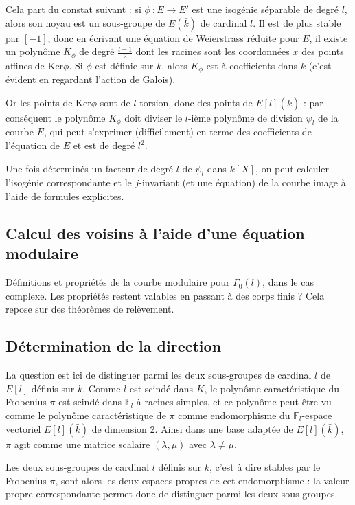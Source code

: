 \documentclass[11pt,a4paper]{article}
\newcommand{\F}{\mathbb{F}}
\newcommand{\vers}{\rightarrow}
\theoremstyle{definition}
\begin{document}
Cela part du constat suivant : si $\phi\ : E\vers E'$ est une isogénie séparable de degré $l$, alors son noyau est un sous-groupe de $E(\bar{k})$ de cardinal $l$. Il est de plus stable par $[-1]$, donc en écrivant une équation de Weierstrass réduite pour $E$, il existe un polynôme $K_\phi$ de degré $\frac{l-1}{2}$ dont les racines sont les coordonnées $x$ des points affines de Ker$\phi$. Si $\phi$ est définie sur $k$, alors $K_\phi$ est à coefficients dans $k$ (c'est évident en regardant l'action de Galois).

Or les points de Ker$\phi$ sont de $l$-torsion, donc des points de $E[l](\bar{k})$ : par conséquent le polynôme $K_\phi$ doit diviser le $l$-ième polynôme de division $\psi_l$ de la courbe $E$, qui peut s'exprimer (difficilement) en terme des coefficients de l'équation de $E$ et est de degré $l^2$.

Une fois déterminés un facteur de degré $l$ de $\psi_l$ dans $k[X]$, on peut calculer l'isogénie correspondante et le $j$-invariant (et une équation) de la courbe image à l'aide de formules explicites.

\subsection{Calcul des voisins à l'aide d'une équation modulaire}

Définitions et propriétés de la courbe modulaire pour $\Gamma_0(l)$, dans le cas complexe.
Les propriétés restent valables en passant à des corps finis ? Cela repose sur des théorèmes de relèvement.

\subsection{Détermination de la direction}

La question est ici de distinguer parmi les deux sous-groupes de cardinal $l$ de $E[l]$ définis sur $k$. Comme $l$ est scindé dans $K$, le polynôme caractéristique du Frobenius $\pi$ est scindé dans $\F_l$ à racines simples, et ce polynôme peut être vu comme le polynôme caractéristique de $\pi$ comme endomorphisme du $\F_l$-espace vectoriel $E[l](\bar{k})$ de dimension 2. Ainsi dans une base adaptée de $E[l](\bar{k})$, $\pi$ agit comme une matrice scalaire $(\lambda,\mu)$ avec $\lambda\neq\mu$.

Les deux sous-groupes de cardinal $l$ définis sur $k$, c'est à dire stables par le Frobenius $\pi$, sont alors les deux espaces propres de cet endomorphisme : la valeur propre correspondante permet donc de distinguer parmi les deux sous-groupes.
\end{document}
